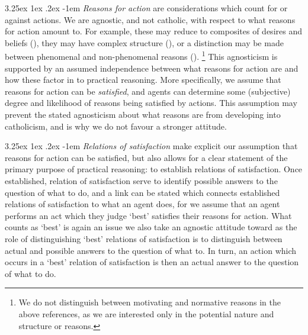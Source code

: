 \documentclass[10pt]{article}
\makeatletter
\renewcommand\paragraph{\@startsection{paragraph}{5}{\z@}%
  {3.25ex \@plus1ex \@minus.2ex}%
  {-1em}%
  {\normalfont\normalsize\bfseries}}
\makeatother
\begin{document}
\paragraph{ }%
\emph{Reasons for action} are considerations which count for or against actions.
We are agnostic, and not catholic, with respect to what reasons for action amount to.
For example, these may reduce to composites of desires and beliefs (\cite{Hume:2011aa,Sinhababu:2013aa,Smith:1987aa}), they may have complex structure (\cite{Scanlon:1998aa}), or a distinction may be made between phenomenal and non-phenomenal reasons (\cite{Pettit:2006aa}).\nolinebreak
\footnote{We do not distinguish between motivating and normative reasons in the above references, as we are interested only in the potential nature and structure or reasons.}
This agnosticism is supported by an assumed independence between what reasons for action are and how these factor in to practical reasoning.
More specifically, we assume that reasons for action can be \emph{satisfied}, and agents can determine some (subjective) degree and likelihood of reasons being satisfied by actions.
This assumption may prevent the stated agnosticism about what reasons are from developing into catholicism, and is why we do not favour a stronger attitude.

\paragraph{ }%
\emph{Relations of satisfaction} make explicit our assumption that reasons for action can be satisfied, but also allows for a clear statement of the primary purpose of practical reasoning: to establish relations of satisfaction.
Once established, relation of satisfaction serve to identify possible answers to the question of what to do, and a link can be stated which connects established relations of satisfaction to what an agent does, for we assume that an agent performs an act which they judge `best' satisfies their reasons for action.
What counts as `best' is again an issue we also take an agnostic attitude toward as the role of distinguishing `best' relations of satisfaction is to distinguish between actual and possible answers to the question of what to.
In turn, an action which occurs in a `best' relation of satisfaction is then an actual answer to the question of what to do.
\end{document}
